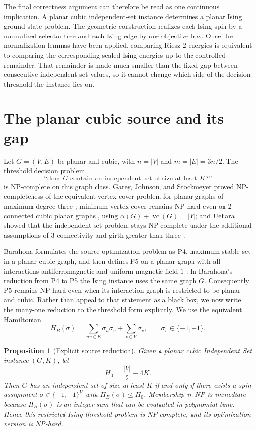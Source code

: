 \documentclass[12pt,a4paper]{article}
\newtheorem{proposition}[theorem]{Proposition}
\newcommand{\sgnspin}{\{-1,+1\}}
\begin{document}
The final correctness argument can therefore be read as one continuous implication.  A planar cubic independent-set instance determines a planar Ising ground-state problem.  The geometric construction realizes each Ising spin by a normalized selector tree and each Ising edge by one objective box.  Once the normalization lemmas have been applied, comparing Riesz $2$-energies is equivalent to comparing the corresponding scaled Ising energies up to the controlled remainder.  That remainder is made much smaller than the fixed gap between consecutive independent-set values, so it cannot change which side of the decision threshold the instance lies on.

\section{The planar cubic source and its gap}\label{sec:source}

Let $G=(V,E)$ be planar and cubic, with $n=|V|$ and $m=|E|=3n/2$.  The threshold decision problem
\[
  \text{``does $G$ contain an independent set of size at least $K$?''}
\]
is NP-complete on this graph class.  Garey, Johnson, and Stockmeyer proved NP-completeness of the equivalent vertex-cover problem for planar graphs of maximum degree three \cite{GareyJohnsonStockmeyer1976}; minimum vertex cover remains NP-hard even on 2-connected cubic planar graphs \cite{Mohar2001}, using $\alpha(G)+\operatorname{vc}(G)=|V|$; and Uehara showed that the independent-set problem stays NP-complete under the additional assumptions of 3-connectivity and girth greater than three \cite{Uehara1996}.

Barahona formulates the source optimization problem as P4, maximum stable set in a planar cubic graph, and then defines P5 on a planar graph with all interactions antiferromagnetic and uniform magnetic field $1$ \cite{Barahona1982}.  In Barahona's reduction from P4 to P5 the Ising instance uses the same graph $G$.  Consequently P5 remains NP-hard even when its interaction graph is restricted to be planar and cubic.  Rather than appeal to that statement as a black box, we now write the many-one reduction to the threshold form explicitly.  We use the equivalent Hamiltonian
\begin{equation}\label{eq:HB}
 H_B(\sigma)=\sum_{uv\in E}\sigma_u\sigma_v+\sum_{v\in V}\sigma_v,
 \qquad \sigma_v\in\sgnspin.
\end{equation}

\begin{proposition}[Explicit source reduction]\label{prop:source-reduction}
Given a planar cubic Independent Set instance $(G,K)$, let
\[
 H_0=\frac{|V|}{2}-4K.
\]
Then $G$ has an independent set of size at least $K$ if and only if there exists a spin assignment $\sigma\in\{-1,+1\}^{V}$ with $H_B(\sigma)\le H_0$.  Membership in NP is immediate because $H_B(\sigma)$ is an integer sum that can be evaluated in polynomial time.  Hence this restricted Ising threshold problem is NP-complete, and its optimization version is NP-hard.
\end{proposition}
\end{document}
